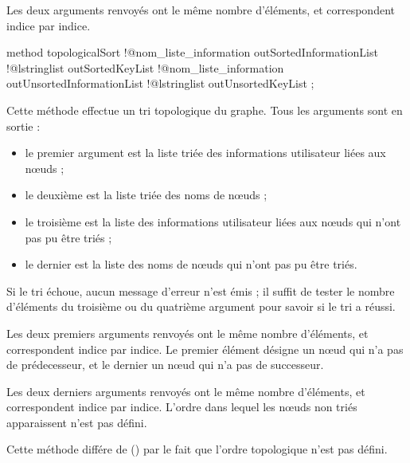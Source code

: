 Les deux arguments renvoyés ont le même nombre d'éléments, et correspondent indice par indice.






\begin{galgascode}
method topologicalSort
  !@nom_liste_information outSortedInformationList
  !@lstringlist outSortedKeyList
  !@nom_liste_information outUnsortedInformationList
  !@lstringlist outUnsortedKeyList
;
\end{galgascode}

Cette méthode effectue un tri topologique du graphe. Tous les arguments sont en sortie :
\begin{itemize}
  \item le premier argument  est la liste triée des informations utilisateur liées aux nœuds ;
  \item le deuxième  est la liste triée des noms de nœuds ;
  \item le troisième  est la liste des informations utilisateur liées aux nœuds qui n'ont pas pu être triés ;
  \item le dernier  est la liste des noms de nœuds qui n'ont pas pu être triés.
\end{itemize}

Si le tri échoue, aucun message d'erreur n'est émis ; il suffit de tester le nombre d'éléments du troisième ou du quatrième argument pour savoir si le tri a réussi.

Les deux premiers arguments renvoyés ont le même nombre d'éléments, et correspondent indice par indice. Le premier élément désigne un nœud qui n'a pas de prédecesseur, et le dernier un nœud qui n'a pas de successeur.


Les deux derniers arguments renvoyés ont le même nombre d'éléments, et correspondent indice par indice. L'ordre dans lequel les nœuds non triés apparaissent n'est pas défini.

Cette méthode différe de  () par le fait que  l'ordre topologique n'est pas défini.
